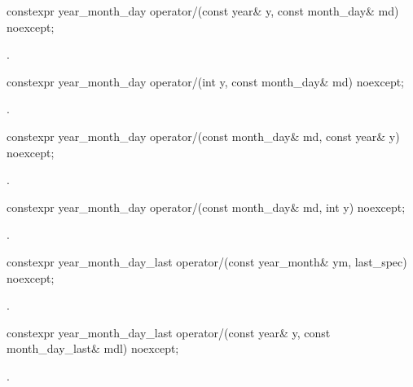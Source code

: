 \begin{itemdecl}
constexpr year_month_day
  operator/(const year& y, const month_day& md) noexcept;
\end{itemdecl}

\begin{itemdescr}
\pnum
\returns {}.
\end{itemdescr}

\begin{itemdecl}
constexpr year_month_day
  operator/(int y, const month_day& md) noexcept;
\end{itemdecl}

\begin{itemdescr}
\pnum
\returns {}.
\end{itemdescr}

\begin{itemdecl}
constexpr year_month_day
  operator/(const month_day& md, const year& y) noexcept;
\end{itemdecl}

\begin{itemdescr}
\pnum
\returns {}.
\end{itemdescr}

\begin{itemdecl}
constexpr year_month_day
  operator/(const month_day& md, int y) noexcept;
\end{itemdecl}

\begin{itemdescr}
\pnum
\returns {}.
\end{itemdescr}

\begin{itemdecl}
constexpr year_month_day_last
  operator/(const year_month& ym, last_spec) noexcept;
\end{itemdecl}

\begin{itemdescr}
\pnum
\returns {}.
\end{itemdescr}

\begin{itemdecl}
constexpr year_month_day_last
  operator/(const year& y, const month_day_last& mdl) noexcept;
\end{itemdecl}

\begin{itemdescr}
\pnum
\returns {}.
\end{itemdescr}

